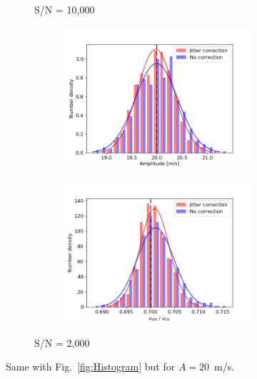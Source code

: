 \begin{figure}[tbp]
\begin{subfigure}[b]{1.0\textwidth}
\begin{subfigure}[b]{0.49\textwidth}
        \end{subfigure}
        \caption{S/N = 10,000}
    \end{subfigure}
    \begin{subfigure}[b]{1.0\textwidth}
    		\begin{subfigure}[b]{0.49\textwidth}
        		\includegraphics[width=\textwidth]{./Figures/Methods/Histogram_new1_p20_sn2000.png}
		\end{subfigure}
		\begin{subfigure}[b]{0.49\textwidth}        		
        		\includegraphics[width=\textwidth]{./Figures/Methods/Histogram_new2_p20_sn2000.png}
        	\end{subfigure}
        	\caption{S/N = 2,000}
    \end{subfigure}	       
    \caption[Histogram of recovered orbital parameters ($A = 20$~m/s)]
    {Same with Fig.~\ref{fig:Histogram} but for $A = 20$~m/s.}
\label{fig:Histogram20}
\end{figure}    

